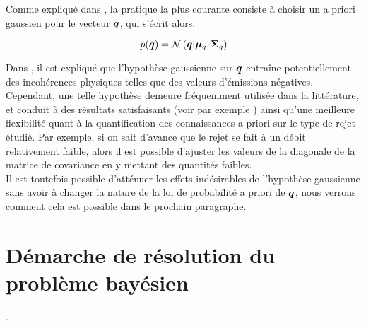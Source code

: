 Comme expliqué dans \cite{Winiarek2011}, la pratique la plus courante consiste à choisir un a priori gaussien pour le vecteur ${\bm{q}}$, qui s'écrit alors:

\begin{equation}
p({\bm{q}}) = \mathcal{N}\left({\bm{q}} \middle \vert {\bm{\mu}_q}, {\bm{\Sigma}_q}\right)
\label{eq_AE_8}
\end{equation}

Dans \cite{Bocquet2008}, il est expliqué que l'hypothèse gaussienne sur ${\bm{q}}$ entraîne potentiellement des incohérences physiques telles que des valeurs d'émissions négatives. Cependant, une telle hypothèse demeure fréquemment utilisée dans la littérature, et conduit à des résultats satisfaisants (voir par exemple \cite{Issartel2003}) ainsi qu'une meilleure flexibilité quant à la quantification des connaissances a priori sur le type de rejet étudié. Par exemple, si on sait d'avance que le rejet se fait à un débit relativement faible, alors il est possible d'ajuster les valeurs de la diagonale de la matrice de covariance en y mettant des quantités faibles. \\

Il est toutefois possible d'atténuer les effets indésirables de l'hypothèse gaussienne sans avoir à changer la nature de la loi de probabilité a priori de ${\bm{q}}$, nous verrons comment cela est possible dans le prochain paragraphe.

\section{Démarche de résolution du problème bayésien}

.\\


\newpage {}

